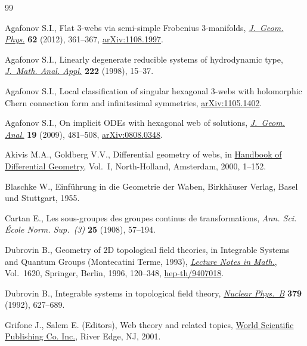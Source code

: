 \documentclass[pdftex]{sigma}
\begin{document}
\begin{thebibliography}{99}
\footnotesize\itemsep=0pt

Agafonov S.I., Flat 3-webs via semi-simple {F}robenius 3-manifolds,
  \href{http://dx.doi.org/10.1016/j.geomphys.2011.10.020}{\textit{J.~Geom. Phys.}} \textbf{62} (2012), 361--367, \href{http://arxiv.org/abs/1108.1997}{arXiv:1108.1997}.

Agafonov S.I., Linearly degenerate reducible systems of hydrodynamic type,
  \href{http://dx.doi.org/10.1006/jmaa.1996.5357}{\textit{J.~Math. Anal. Appl.}} \textbf{222} (1998), 15--37.

Agafonov S.I., Local classif\/ication of singular hexagonal 3-webs with
  holomorphic Chern connection form and inf\/initesimal symmetries,
  \href{http://arxiv.org/abs/1105.1402}{arXiv:1105.1402}.

Agafonov S.I., On implicit {ODE}s with hexagonal web of solutions,
  \href{http://dx.doi.org/10.1007/s12220-009-9071-1}{\textit{J.~Geom. Anal.}} \textbf{19} (2009), 481--508, \href{http://arxiv.org/abs/0808.0348}{arXiv:0808.0348}.

Akivis M.A., Goldberg V.V., Dif\/ferential geometry of webs, in \href{http://dx.doi.org/10.1016/S1874-5741(00)80004-7}{Handbook of
  Dif\/ferential Geometry}, {V}ol.~I, North-Holland, Amsterdam, 2000, 1--152.

Blaschke W., Einf\"uhrung in die {G}eometrie der {W}aben, Birkh\"auser Verlag,
  Basel und Stuttgart, 1955.

Cartan E., Les sous-groupes des groupes continus de transformations,
  \textit{Ann. Sci. \'Ecole Norm. Sup.~(3)} \textbf{25} (1908), 57--194.


Dubrovin B., Geometry of {$2$}{D} topological f\/ield theories, in Integrable
  Systems and Quantum Groups ({M}ontecatini {T}erme, 1993), \href{http://dx.doi.org/10.1007/BFb0094793}{\textit{Lecture
  Notes in Math.}}, Vol.~1620, Springer, Berlin, 1996, 120--348,
  \href{http://arxiv.org/abs/hep-th/9407018}{hep-th/9407018}.

Dubrovin B., Integrable systems in topological f\/ield theory, \href{http://dx.doi.org/10.1016/0550-3213(92)90137-Z}{\textit{Nuclear
  Phys.~B}} \textbf{379} (1992), 627--689.

Grifone J., Salem E. (Editors), Web theory and related topics, \href{http://dx.doi.org/10.1142/9789812794581}{World Scientif\/ic
  Publishing Co. Inc.}, River Edge, NJ, 2001.


\end{thebibliography}
\end{document}
